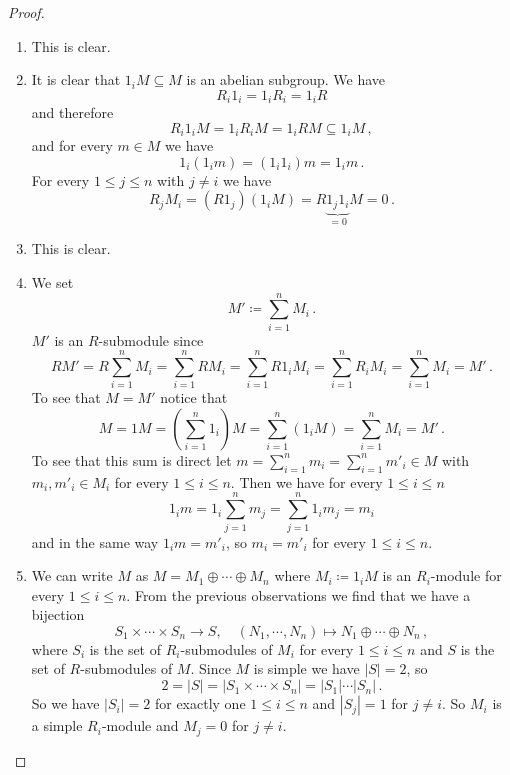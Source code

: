 \begin{proof}
  \begin{enumerate}[label=\emph{\alph*)},leftmargin=*]
    \item
      This is clear.
    \item
      It is clear that $1_i M \subseteq M$ is an abelian subgroup. We have
      \[
          R_i 1_i
        = 1_i R_i
        = 1_i R
      \]
      and therefore
      \[
                  R_i 1_i M
        =         1_i R_i M
        =         1_i R M
        \subseteq 1_i M \,,
      \]
      and for every $m \in M$ we have
      \[
          1_i (1_i m)
        = (1_i 1_i) m
        = 1_i m \,.
      \]
      For every $1 \leq j \leq n$ with $j \neq i$ we have
      \[
          R_j M_i
        = (R 1_j) (1_i M)
        = R \underbrace{1_j 1_i}_{=0} M
        = 0 \,.
      \]
    \item
      This is clear.
    \item
      We set
      \[
        M' \coloneqq \sum_{i=1}^n M_i \,.
      \]
      $M'$ is an $R$-submodule since
      \[
          R M'
        = R \sum_{i=1}^n M_i
        = \sum_{i=1}^n R M_i
        = \sum_{i=1}^n R 1_i M_i
        = \sum_{i=1}^n R_i M_i
        = \sum_{i=1}^n M_i
        = M' \,.
      \]
      To see that $M = M'$ notice that
      \[
          M
        = 1 M
        = \left( \sum_{i=1}^n 1_i \right) M
        = \sum_{i=1}^n (1_i M)
        = \sum_{i=1}^n M_i
        = M' \,.
      \]
      To see that this sum is direct let $m = \sum_{i=1}^n m_i = \sum_{i=1}^n m'_i \in M$ with $m_i, m'_i \in M_i$ for every $1 \leq i \leq n$.
      Then we have for every $1 \leq i \leq n$
      \[
          1_i m
        = 1_i \sum_{j=1}^n m_j
        = \sum_{j=1}^n 1_i m_j
        = m_i
      \]
      and in the same way $1_i m = m'_i$, so $m_i = m'_i$ for every $1 \leq i \leq n$.
    \item
      We can write $M$ as $M = M_1 \oplus \dotsb \oplus M_n$ where $M_i \coloneqq 1_i M$ is an $R_i$-module for every $1 \leq i \leq n$.
      From the previous observations we find that we have a bijection
      \[
                S_1 \times \dotsb \times S_n
        \to     S,
        \quad   (N_1, \dotsb, N_n)
        \mapsto N_1 \oplus \dotsb \oplus N_n \,,
      \]
      where $S_i$ is the set of $R_i$-submodules of $M_i$ for every $1 \leq i \leq n$ and $S$ is the set of $R$-submodules of $M$.
      Since $M$ is simple we have $|S| = 2$, so
      \[
          2
        = |S|
        = |S_1 \times \dotsb \times S_n|
        = |S_1| \dotsm |S_n| \,.
      \]
      So we have $|S_i| = 2$ for exactly one $1 \leq i \leq n$ and $|S_j| = 1$ for $j \neq i$.
      So $M_i$ is a simple $R_i$-module and $M_j = 0$ for $j \neq i$.
    \qedhere
  \end{enumerate}
\end{proof}


